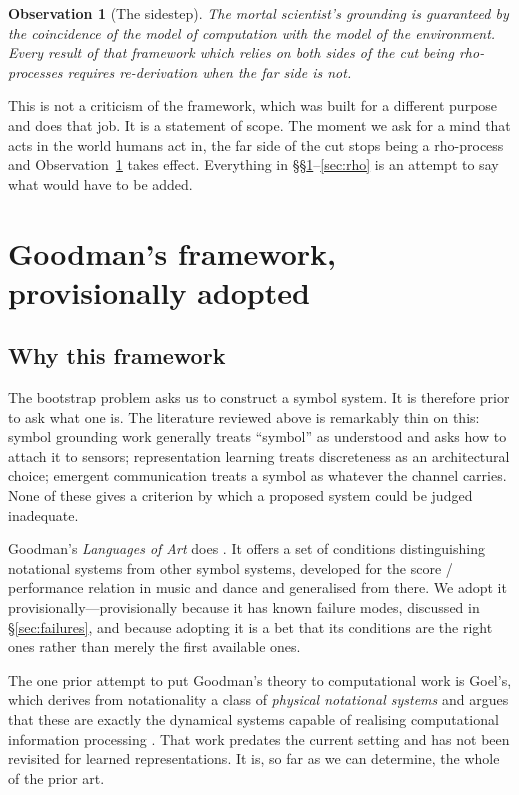 \documentclass[11pt,a4paper]{article}
\theoremstyle{definition}
\theoremstyle{plain}
\newtheorem{observation}[definition]{Observation}
\theoremstyle{remark}
\newcommand{\rc}{\textup{rho}}
\begin{document}
\begin{observation}[The sidestep]
\label{obs:sidestep}
The mortal scientist's grounding is guaranteed by the coincidence of the model of
computation with the model of the environment. Every result of that framework which
relies on both sides of the cut being \rc{}-processes requires re-derivation when the far
side is not.
\end{observation}

\noindent This is not a criticism of the framework, which was built for a different
purpose and does that job. It is a statement of scope. The moment we ask for a mind that
acts in the world humans act in, the far side of the cut stops being a \rc{}-process and
Observation~\ref{obs:sidestep} takes effect. Everything in \S\S\ref{sec:goodman}--\ref{sec:rho}
is an attempt to say what would have to be added.

\section{Goodman's framework, provisionally adopted}
\label{sec:goodman}

\subsection{Why this framework}

The bootstrap problem asks us to construct a symbol system. It is therefore prior to ask
what one is. The literature reviewed above is remarkably thin on this: symbol grounding
work generally treats ``symbol'' as understood and asks how to attach it to sensors;
representation learning treats discreteness as an architectural choice; emergent
communication treats a symbol as whatever the channel carries. None of these gives a
criterion by which a proposed system could be judged inadequate.

Goodman's \emph{Languages of Art} does \cite{goodman1968}. It offers a set of conditions
distinguishing notational systems from other symbol systems, developed for the score /
performance relation in music and dance and generalised from there. We adopt it
provisionally---provisionally because it has known failure modes, discussed in
\S\ref{sec:failures}, and because adopting it is a bet that its conditions are the right
ones rather than merely the first available ones.

The one prior attempt to put Goodman's theory to computational work is Goel's, which
derives from notationality a class of \emph{physical notational systems} and argues that
these are exactly the dynamical systems capable of realising computational information
processing \cite{goel1991}. That work predates the current setting and has not been
revisited for learned representations. It is, so far as we can determine, the whole of
the prior art.
\end{document}
